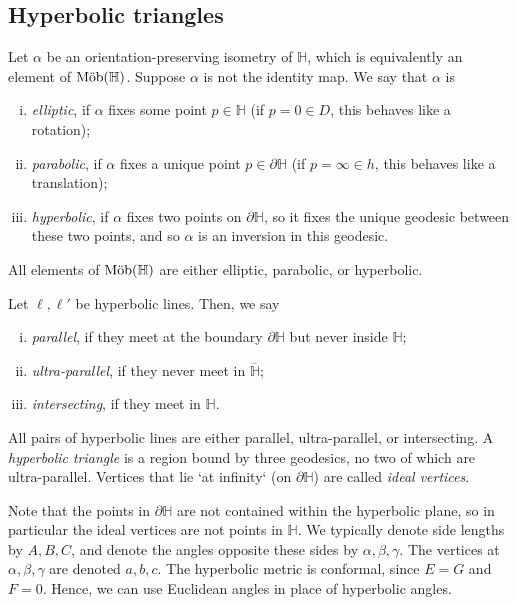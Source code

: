 \subsection{Hyperbolic triangles}
\begin{definition}
	Let \( \alpha \) be an orientation-preserving isometry of \( \mathbb H \), which is equivalently an element of \( \text{M\"ob}(\mathbb H) \).
	Suppose \( \alpha \) is not the identity map.
	We say that \( \alpha \) is
	\begin{enumerate}[(i)]
		\item \textit{elliptic}, if \( \alpha \) fixes some point \( p \in \mathbb H \) (if \( p = 0 \in D \), this behaves like a rotation);
		\item \textit{parabolic}, if \( \alpha \) fixes a unique point \( p \in \partial \mathbb H \) (if \( p = \infty \in h \), this behaves like a translation);
		\item \textit{hyperbolic}, if \( \alpha \) fixes two points on \( \partial \mathbb H \), so it fixes the unique geodesic between these two points, and so \( \alpha \) is an inversion in this geodesic.
	\end{enumerate}
	All elements of \( \text{M\"ob}(\mathbb H) \) are either elliptic, parabolic, or hyperbolic.
\end{definition}
\begin{definition}
	Let \( \ell, \ell' \) be hyperbolic lines.
	Then, we say
	\begin{enumerate}[(i)]
		\item \textit{parallel}, if they meet at the boundary \( \partial \mathbb H \) but never inside \( \mathbb H \);
		\item \textit{ultra-parallel}, if they never meet in \( \overline{\mathbb H} \);
		\item \textit{intersecting}, if they meet in \( \mathbb H \).
	\end{enumerate}
	All pairs of hyperbolic lines are either parallel, ultra-parallel, or intersecting.
	A \textit{hyperbolic triangle} is a region bound by three geodesics, no two of which are ultra-parallel.
	Vertices that lie `at infinity` (on \( \partial \mathbb H \)) are called \textit{ideal vertices}.
\end{definition}
Note that the points in \( \partial \mathbb H \) are not contained within the hyperbolic plane, so in particular the ideal vertices are not points in \( \mathbb H \).
We typically denote side lengths by \( A, B, C \), and denote the angles opposite these sides by \( \alpha, \beta, \gamma \).
The vertices at \( \alpha, \beta, \gamma \) are denoted \( a, b, c \).
The hyperbolic metric is conformal, since \( E = G \) and \( F = 0 \).
Hence, we can use Euclidean angles in place of hyperbolic angles.

